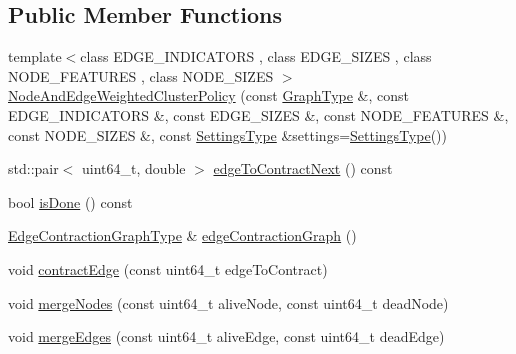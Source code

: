 \subsection*{Public Member Functions}
\begin{DoxyCompactItemize}
\item 
{\footnotesize template$<$class E\+D\+G\+E\+\_\+\+I\+N\+D\+I\+C\+A\+T\+O\+R\+S , class E\+D\+G\+E\+\_\+\+S\+I\+Z\+E\+S , class N\+O\+D\+E\+\_\+\+F\+E\+A\+T\+U\+R\+E\+S , class N\+O\+D\+E\+\_\+\+S\+I\+Z\+E\+S $>$ }\\\hyperlink{classnifty_1_1graph_1_1agglo_1_1NodeAndEdgeWeightedClusterPolicy_a7ba043c2461fc998dff07fa8c35c8f76}{Node\+And\+Edge\+Weighted\+Cluster\+Policy} (const \hyperlink{classnifty_1_1graph_1_1agglo_1_1NodeAndEdgeWeightedClusterPolicy_a293d476ffc7b8513eeb20c21bfefb579}{Graph\+Type} \&, const E\+D\+G\+E\+\_\+\+I\+N\+D\+I\+C\+A\+T\+O\+R\+S \&, const E\+D\+G\+E\+\_\+\+S\+I\+Z\+E\+S \&, const N\+O\+D\+E\+\_\+\+F\+E\+A\+T\+U\+R\+E\+S \&, const N\+O\+D\+E\+\_\+\+S\+I\+Z\+E\+S \&, const \hyperlink{structnifty_1_1graph_1_1agglo_1_1NodeAndEdgeWeightedClusterPolicy_1_1SettingsType}{Settings\+Type} \&settings=\hyperlink{structnifty_1_1graph_1_1agglo_1_1NodeAndEdgeWeightedClusterPolicy_1_1SettingsType}{Settings\+Type}())
\item 
std\+::pair$<$ uint64\+\_\+t, double $>$ \hyperlink{classnifty_1_1graph_1_1agglo_1_1NodeAndEdgeWeightedClusterPolicy_a8c46d1d45de4e4848f81199c59c140d4}{edge\+To\+Contract\+Next} () const 
\item 
bool \hyperlink{classnifty_1_1graph_1_1agglo_1_1NodeAndEdgeWeightedClusterPolicy_a51d3e835b732c1e6e1123592d3c7e8d1}{is\+Done} () const 
\item 
\hyperlink{classnifty_1_1graph_1_1agglo_1_1NodeAndEdgeWeightedClusterPolicy_a467e2768e424a998379deedaaebfe9a9}{Edge\+Contraction\+Graph\+Type} \& \hyperlink{classnifty_1_1graph_1_1agglo_1_1NodeAndEdgeWeightedClusterPolicy_ae1c49f97ec8e6c52b5ab36bf355c2022}{edge\+Contraction\+Graph} ()
\item 
void \hyperlink{classnifty_1_1graph_1_1agglo_1_1NodeAndEdgeWeightedClusterPolicy_ac9ee8dd91c7b322b85ea0a92c6c40918}{contract\+Edge} (const uint64\+\_\+t edge\+To\+Contract)
\item 
void \hyperlink{classnifty_1_1graph_1_1agglo_1_1NodeAndEdgeWeightedClusterPolicy_a250a448d4fd3b9181b667ae7e9782fa8}{merge\+Nodes} (const uint64\+\_\+t alive\+Node, const uint64\+\_\+t dead\+Node)
\item 
void \hyperlink{classnifty_1_1graph_1_1agglo_1_1NodeAndEdgeWeightedClusterPolicy_afe46489c03ca7bf98b2f84d79981b434}{merge\+Edges} (const uint64\+\_\+t alive\+Edge, const uint64\+\_\+t dead\+Edge)

\end{DoxyCompactItemize}

